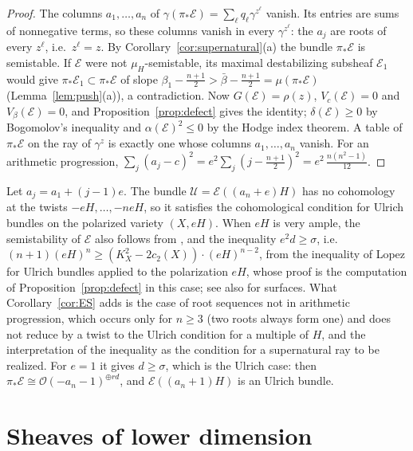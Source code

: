 \documentclass[11pt]{amsart}
\theoremstyle{definition}
\theoremstyle{remark}
\newcommand{\OO}{\mathcal{O}}
\newcommand{\cE}{\mathcal{E}}
\newcommand{\cU}{\mathcal{U}}
\begin{document}
\begin{proof}
The columns $a_1,\dots,a_n$ of $\gamma(\pi_*\cE)=\sum_\ell q_\ell\gamma^{z^\ell}$ vanish. Its entries are sums of nonnegative terms, so these columns vanish in every $\gamma^{z^\ell}$: the $a_j$ are roots of every $z^\ell$, i.e.\ $z^\ell=z$. By Corollary~\ref{cor:supernatural}(a) the bundle $\pi_*\cE$ is semistable. If $\cE$ were not $\mu_H$-semistable, its maximal destabilizing subsheaf $\cE_1$ would give $\pi_*\cE_1\subset\pi_*\cE$ of slope $\beta_1-\frac{n+1}2>\bar\beta-\frac{n+1}2=\mu(\pi_*\cE)$ (Lemma~\ref{lem:push}(a)), a contradiction. Now $G(\cE)=\rho(z)$, $V_c(\cE)=0$ and $V_\beta(\cE)=0$, and Proposition~\ref{prop:defect} gives the identity; $\delta(\cE)\ge0$ by Bogomolov's inequality and $\alpha(\cE)^2\le0$ by the Hodge index theorem. A table of $\pi_*\cE$ on the ray of $\gamma^{z}$ is exactly one whose columns $a_1,\dots,a_n$ vanish. For an arithmetic progression, $\sum_j(a_j-c)^2=e^2\sum_j(j-\frac{n+1}2)^2=e^2\,\frac{n(n^2-1)}{12}$.
\end{proof}

Let $a_j=a_1+(j-1)e$. The bundle $\cU=\cE((a_n+e)H)$ has no cohomology at the twists $-eH,\dots,-neH$, so it satisfies the cohomological condition for Ulrich bundles on the polarized variety $(X,eH)$. When $eH$ is very ample, the semistability of $\cE$ also follows from \cite[Thm.~2.9]{CH12}, and the inequality $e^2d\ge\sigma$, i.e.\ $(n+1)(eH)^n\ge(K_X^2-2c_2(X))\cdot(eH)^{n-2}$, from the inequality of Lopez for Ulrich bundles \cite[Lem.~3.1]{Lo26} applied to the polarization $eH$, whose proof is the computation of Proposition~\ref{prop:defect} in this case; see also \cite{An1} for surfaces. What Corollary~\ref{cor:ES} adds is the case of root sequences not in arithmetic progression, which occurs only for $n\ge3$ (two roots always form one) and does not reduce by a twist to the Ulrich condition for a multiple of $H$, and the interpretation of the inequality as the condition for a supernatural ray to be realized. For $e=1$ it gives $d\ge\sigma$, which is the Ulrich case: then $\pi_*\cE\cong\OO(-a_n-1)^{\oplus rd}$, and $\cE((a_n+1)H)$ is an Ulrich bundle.

\section{Sheaves of lower dimension}\label{sec:lowerdim}
\end{document}
